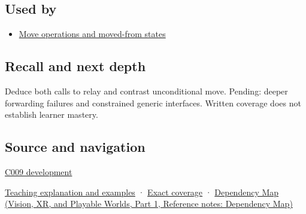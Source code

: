 \subsection{Used by}\label{appendix-0104b704fb11-used-by}

\hypertarget{appendix-0104b704fb11-used-by}{}

\begin{itemize}
\tightlist
\item
  \hyperref[appendix-5636651017c2]{Move operations and moved-from states}
\end{itemize}

\subsection{Recall and next depth}\label{appendix-0104b704fb11-recall-and-next-depth}

\hypertarget{appendix-0104b704fb11-recall-and-next-depth}{}

Deduce both calls to relay and contrast unconditional move. Pending: deeper forwarding failures and constrained generic interfaces. Written coverage does not establish learner mastery.

\subsection{Source and navigation}\label{appendix-0104b704fb11-source-and-navigation}

\hypertarget{appendix-0104b704fb11-source-and-navigation}{}

\hyperref[appendix-fd090d982a15-m009---parts-127-147]{C009 development}

\hyperref[01-foundations-i-ch003-move-permission-is-not-resource-transfer]{Teaching explanation and examples} · \hyperref[appendix-fd090d982a15-m008---parts-113-126]{Exact coverage} · \href{../07-Vision-XR-and-Playable-Worlds-P01/main.pdf\#nameddest=appendix-4ad47bdd269a}{Dependency Map (Vision, XR, and Playable Worlds, Part 1, Reference notes: Dependency Map)}
